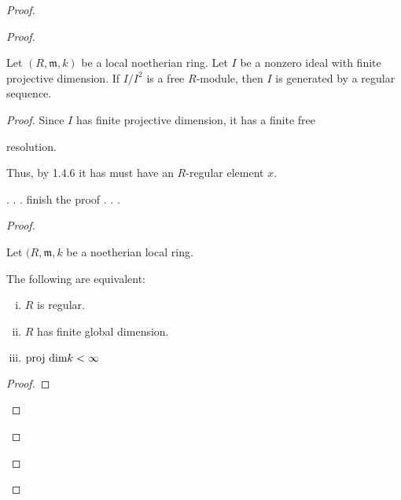 \begin{proof}


\begin{proof}



\begin{theorem}
  \label{thm:ferrand_vasconcelos}

  Let $(R,\mathfrak{m},k)$ be a local noetherian ring.
  Let $I$ be a nonzero ideal with finite projective dimension.
  If $I / I^2$ is a free $R$-module, 
  then $I$ is generated by a regular sequence.
\end{theorem}



\begin{proof}

  Since $I$ has finite projective dimension, it has a finite free

  resolution.

  Thus, by 1.4.6 it has must have an $R$-regular element $x$.

  . . . finish the proof . . . 

\begin{proof}






\begin{theorem}

  \label{thm:auslander_buchsbaum_serre}

  Let $(R,\mathfrak{m},k$ be a noetherian local ring.

  The following are equivalent:

  \begin{enumerate}[(i)]

    \item $R$ is regular.

    \item $R$ has finite global dimension.

    \item $\text{proj dim} k < \infty$

  \end{enumerate}

\end{theorem}



\begin{proof}


\end{proof}
\end{proof}
\end{proof}
\end{proof}
\end{proof}
